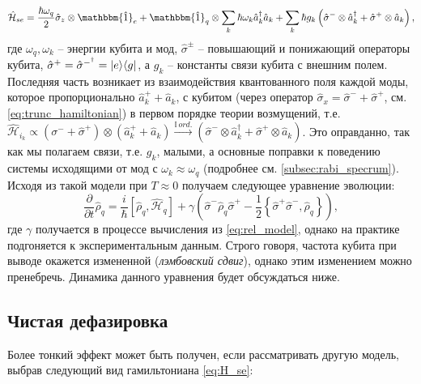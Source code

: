 \documentclass[12pt, twoside]{report}
\DeclarePairedDelimiter\bra{\langle}{\rvert}
\DeclarePairedDelimiter\ket{\lvert}{\rangle}
\newcommand{\rbrkt}[1]{\left( #1 \right)}
\newcommand{\sbrkt}[1]{\left[ #1 \right]}
\numberwithin{equation}{section}
\numberwithin{figure}{section}
\begin{document}
\begin{equation}
\mathcal{\hat H}_{se} = \frac{\hbar \omega_q}{2} \hat \sigma_z \otimes \mathbbm{\hat 1}_e + \mathbbm{\hat 1}_q \otimes  \sum_k \hbar \omega_k \hat a_k^\dag \hat a_k  + \sum_k \hbar g_k \rbrkt{\hat \sigma^-\otimes \hat a_k^\dag +  \hat \sigma^+ \otimes \hat a_k},
\label{eq:rel_model}
\end{equation}
где $\omega_q, \omega_k$ -- энергии кубита и мод, $\hat \sigma^{\pm}$ -- повышающий и понижающий операторы кубита, $\hat \sigma^+ = \hat{\sigma}^{-^\dag} = \ket{e}\bra{g}$, а $g_k$ -- константы связи кубита с внешним полем. Последняя часть возникает из взаимодействия квантованного поля каждой моды, которое пропорционально $\hat a_k^+ + \hat a_k$, с кубитом (через оператор $\hat \sigma_x = \hat \sigma^-+  \hat \sigma^+ $, см. \eqref{eq:trunc_hamiltonian}) в первом порядке теории возмущений, т.е. $\mathcal{\hat H}_{i_k} \propto \rbrkt{\sigma^-+  \hat \sigma^+}\otimes\rbrkt{\hat a_k^+ + \hat a_k}\overset{\mathbb{I}\, ord.}{\rightarrow} (\hat \sigma^-\otimes \hat a_k^\dag +  \hat \sigma^+ \otimes \hat a_k)$. Это оправданно, так как мы полагаем связи, т.е. $g_k$, малыми, а основные поправки к поведению системы исходящими от мод с $\omega_k\approx \omega_q$ (подробнее см. \autoref{subsec:rabi_specrum}). Исходя из такой модели при $T \approx 0$ получаем\cite{carmichael1999} следующее уравнение эволюции:
\begin{equation}
\frac{\partial}{\partial t}\hat \rho_q = \frac{i}{\hbar} \sbrkt{\hat \rho_q, \mathcal{\hat H}_q} +
\gamma (\hat \sigma^- \hat \rho_q \hat \sigma^+ - \frac{1}{2} \left\{ \hat\sigma^+\hat\sigma^-, \hat \rho_q \right\} ),
\end{equation}
где $\gamma$ получается в процессе вычисления из \eqref{eq:rel_model}, однако на практике подгоняется к экспериментальным данным. Строго говоря, частота кубита при выводе окажется измененной (\textit{лэмбовский сдвиг}), однако этим  изменением можно пренебречь. Динамика данного уравнения будет обсуждаться ниже.

\subsection{Чистая дефазировка}

Более тонкий эффект может быть получен, если рассматривать другую модель, выбрав следующий вид гамильтониана \eqref{eq:H_se}\cite{carmichael1999}:
\end{document}
